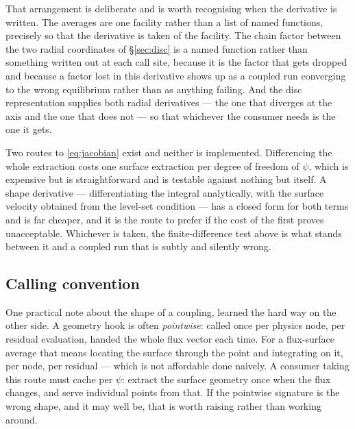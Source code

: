 That arrangement is deliberate and is worth recognising when the derivative is
written. The averages are one facility rather than a list of named functions,
precisely so that the derivative is taken of the facility. The chain factor
between the two radial coordinates of \S\ref{sec:disc} is a named function rather
than something written out at each call site, because it is the factor that gets
dropped and because a factor lost in this derivative shows up as a coupled run
converging to the wrong equilibrium rather than as anything failing. And the disc
representation supplies both radial derivatives --- the one that diverges at the
axis and the one that does not --- so that whichever the consumer needs is the
one it gets.

Two routes to \eqref{eq:jacobian} exist and neither is implemented. Differencing
the whole extraction costs one surface extraction per degree of freedom of $\psi$,
which is expensive but is straightforward and is testable against nothing but
itself. A shape derivative --- differentiating the integral analytically, with the
surface velocity obtained from the level-set condition --- has a closed form for
both terms and is far cheaper, and it is the route to prefer if the cost of the
first proves unacceptable. Whichever is taken, the finite-difference test above
is what stands between it and a coupled run that is subtly and silently wrong.

\subsection{Calling convention}

One practical note about the shape of a coupling, learned the hard way on the
other side. A geometry hook is often \emph{pointwise}: called once per physics
node, per residual evaluation, handed the whole flux vector each time. For a
flux-surface average that means locating the surface through the point and
integrating on it, per node, per residual --- which is not affordable done
naively. A consumer taking this route must cache per $\psi$: extract the surface
geometry once when the flux changes, and serve individual points from that. If
the pointwise signature is the wrong shape, and it may well be, that is worth
raising rather than working around.

